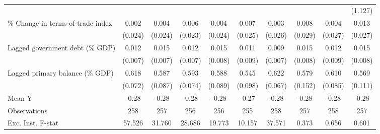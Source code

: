 {\begin{tabular}{l*{9}{c}}
                    &                     &                     &                     &                     &                     &                     &                     &                     &     (1.127)         \\
\addlinespace
\% Change in terms-of-trade index&       0.002         &       0.004         &       0.006         &       0.004         &       0.007         &       0.003         &       0.008         &       0.004         &       0.013         \\
                    &     (0.024)         &     (0.024)         &     (0.023)         &     (0.024)         &     (0.025)         &     (0.026)         &     (0.029)         &     (0.027)         &     (0.027)         \\
\addlinespace
Lagged government debt (\% GDP)&       0.012\sym{*}  &       0.015\sym{**} &       0.012         &       0.015\sym{*}  &       0.011         &       0.009         &       0.015\sym{*}  &       0.012         &       0.015\sym{*}  \\
                    &     (0.007)         &     (0.007)         &     (0.007)         &     (0.008)         &     (0.009)         &     (0.007)         &     (0.008)         &     (0.009)         &     (0.008)         \\
\addlinespace
Lagged primary balance (\% GDP)&       0.618\sym{***}&       0.587\sym{***}&       0.593\sym{***}&       0.588\sym{***}&       0.545\sym{***}&       0.622\sym{***}&       0.579\sym{***}&       0.610\sym{***}&       0.569\sym{***}\\
                    &     (0.072)         &     (0.087)         &     (0.074)         &     (0.089)         &     (0.098)         &     (0.067)         &     (0.152)         &     (0.085)         &     (0.111)         \\
\midrule
Mean Y              &       -0.28         &       -0.28         &       -0.28         &       -0.28         &       -0.27         &       -0.28         &       -0.28         &       -0.28         &       -0.28         \\
Observations        &         258         &         257         &         256         &         256         &         255         &         258         &         257         &         258         &         257         \\
Exc. Inst. F-stat   &      57.526         &      31.760         &      28.686         &      19.773         &      10.157         &      37.571         &       0.373         &       0.656         &       0.601         \\
\bottomrule
\end{tabular}
}
